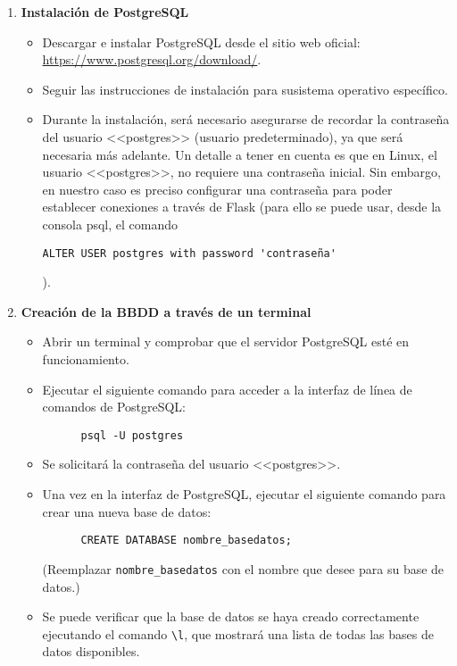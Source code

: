 \begin{enumerate}
  \item \textbf{Instalación de PostgreSQL}

  \begin{itemize}
    \item Descargar e instalar PostgreSQL desde el sitio web oficial: \url{https://www.postgresql.org/download/}.
    \item Seguir las instrucciones de instalación para susistema operativo específico.
    \item Durante la instalación, será necesario asegurarse de recordar la contraseña del usuario <<postgres>> (usuario predeterminado), ya que será necesaria más adelante. Un detalle a tener en cuenta es que en Linux, el usuario <<postgres>>, no requiere una contraseña inicial. Sin embargo, en nuestro caso es preciso configurar una contraseña para poder establecer conexiones a través de Flask (para ello se puede usar, desde la consola psql, el comando \begin{verbatim}ALTER USER postgres with password 'contraseña'\end{verbatim}).
  \end{itemize}

  \item \textbf{Creación de la BBDD a través de un terminal}

  \begin{itemize}
    \item Abrir un terminal y comprobar que el servidor PostgreSQL esté en funcionamiento.
    \item Ejecutar el siguiente comando para acceder a la interfaz de línea de comandos de PostgreSQL:
      \begin{verbatim}
      psql -U postgres
      \end{verbatim}
    \item Se solicitará la contraseña del usuario <<postgres>>.
    \item Una vez en la interfaz de PostgreSQL, ejecutar el siguiente comando para crear una nueva base de datos:
      \begin{verbatim}
      CREATE DATABASE nombre_basedatos;
      \end{verbatim}
      (Reemplazar \texttt{nombre\_basedatos} con el nombre que desee para su base de datos.)
    \item Se puede verificar que la base de datos se haya creado correctamente ejecutando el comando \texttt{\textbackslash l}, que mostrará una lista de todas las bases de datos disponibles.
  \end{itemize}


\end{enumerate}

